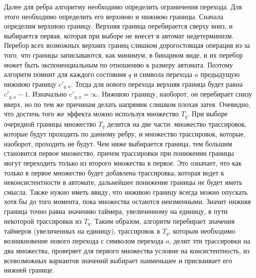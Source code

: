 \documentclass[times,specification,annotation]{itmo-student-thesis}
\begin{document}
Далее для ребра алгоритму необходимо определить ограничения перехода. Для этого необходимо определить его верхнюю и нижнюю границы. Сначала определим верхнюю границу.
Верхняя граница перебирается сверху вниз, и выбирается первая, которая при выборе не внесет в автомат недетерминизм. Перебор всех возможных верхних границ слишком дорогостоящая операция из-за
того, что границы записываются, как минимум, в бинарном виде, и их перебор может быть экспоненциальным по отношению к размеру автомата. Поэтому алгоритм помнит для каждого состояния $q$ и символа
перехода $a$ предыдущую нижнюю границу $c'_{q, a}$. Тогда для нового перехода верхняя граница будет равна $c'_{q, a} - 1$. Изначально $c'_{q, a} = \infty$. Нижнюю границу, наоборот, он
перебирает снизу вверх, но по тем же причинам делать напрямик слишком плохая затея. Очевидно, что достичь того же эффекта можно используя множество $T_q$. При выборе очередной границы 
множество $T_q$ делится
на две части: множество трассировок, которые будут проходить по данному ребру, и множество трассировок, которые, наоборот, проходить не будут. Чем ниже выбирается граница, тем большим становится
первое множество, причем трассировки при понижении границы могут переходить только из второго множества в первое. Это означает, что как только в первое множество будет добавлена трассировка,
которая ведет к неконсистентности в автомате, дальнейшее понижение границы не будет иметь смысла. Также нужно иметь ввиду, что нижнюю границу всегда можно опускать хотя бы до того момента, 
пока множества остаются неизменными. Значит нижняя граница точно равна значению таймера, увеличенному на единицу, в пути некоторой трассировки из $T_q$. Таким образом, алгоритм перебирает 
значения таймеров (увеличенных на единицу), трассировок в $T_q$, которым необходимо возникновение нового перехода с символом перехода $a$, делит эти трассировки на два множества, 
проверяет для первого множества условие на консистентность, из всевозможных вариантов значений выбирает наименьшее и присваивает его нижней границе. 
\end{document}
